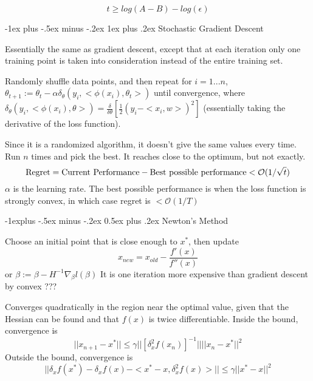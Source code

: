 \documentclass[10pt,landscape]{article}
\makeatletter
\renewcommand{\subsection}{\@startsection{subsection}{2}{0mm}%
                                {-1explus -.5ex minus -.2ex}%
                                {0.5ex plus .2ex}%
                                {\normalfont\normalsize\bfseries}}
\renewcommand{\subsubsection}{\@startsection{subsubsection}{3}{0mm}%
                                {-1ex plus -.5ex minus -.2ex}%
                                {1ex plus .2ex}%
                                {\normalfont\small\bfseries}}
\makeatother
\begin{document}
\begin{multicols}{3}
\begin{equation*}
t \geq log(A - B) - log(\epsilon)
\end{equation*}

\subsubsection{Stochastic Gradient Descent}

Essentially the same as gradient descent, except that at each iteration only one training point is taken into consideration instead of the entire training set.

Randomly shuffle data points, and then repeat for $i = 1 ... n$, $\theta_{t + 1} := \theta_t - \alpha \delta_\theta (y_i, <\phi(x_i), \theta_t>)$ until convergence, where $\delta_\theta(y_i, <\phi(x_i), \theta>) = \frac{\delta}{\delta \theta} \left[ \frac{1}{2} (y_i - <x_i, w>)^2 \right]$ (essentially taking the derivative of the loss function).

Since it is a randomized algorithm, it doesn't give the same values every time. Run $n$ times and pick the best. It reaches close to the optimum, but not exactly.
\begin{equation*}
\textmd{Regret} = \textmd{Current Performance} - \textmd{Best possible performance} < \ensuremath{\mathcal{O}}(1/\sqrt{t})
\end{equation*}
$\alpha$ is the learning rate. The best possible performance is when the loss function is strongly convex, in which case regret is $< \ensuremath{\mathcal{O}}(1/T)$

\subsection{Newton's Method}

Choose an initial point that is close enough to $x^*$, then update
\begin{equation*}
x_{new} = x_{old} - \frac{f'(x)}{f''(x)}
\end{equation*}
or $\beta := \beta - H^{-1} \nabla_\beta l(\beta)$
It is one iteration more expensive than gradient descent by convex ???

Converges quadratically in the region near the optimal value, given that the Hessian can be found and that $f(x)$ is twice differentiable. Inside the bound, convergence is
\begin{equation*}
||x_{n + 1} - x^*|| \leq \gamma || \left[ \delta_x^2 f(x_n) \right]^{-1} || ||x_n - x^*||^2
\end{equation*}
Outside the bound, convergence is
\begin{equation*}
|| \delta_x f(x^*) - \delta_x f(x) - <x^* - x, \delta_x^2 f(x)> || \leq \gamma ||x^* - x||^2
\end{equation*}


\end{multicols}
\end{document}
